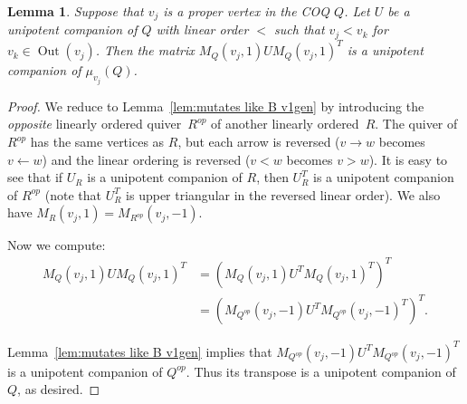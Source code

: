 \documentclass[11pt, letterpaper]{amsart}
\newcommand{\cS}[1]{{\noindent\textsf{\color{purple}$\blacksquare$~#1~$\blacksquare$}}}
\newcommand{\hide}[1]{}
\newtheorem{lemma}[theorem]{Lemma}
\theoremstyle{definition}
\numberwithin{equation}{section}
\def\Out{{\operatorname{Out}}}
\begin{document}
\begin{lemma}
\label{lem:mutates like B v2gen}
Suppose that $v_j$ is a proper vertex in the COQ $Q$.
Let $U$ be a unipotent companion of $Q$ with linear order $<$ such that $v_j < v_k$ for $v_k \in \Out(v_j)$.
Then the matrix $M_Q(v_j, 1) U M_Q(v_j, 1)^T$ is a unipotent companion of $\mu_{v_j}(Q)$.
\end{lemma}

\begin{proof}
We reduce to Lemma~\ref{lem:mutates like B v1gen} by introducing the \emph{opposite} linearly ordered quiver~$R^{op}$ of another linearly ordered~$R$.
The quiver of $R^{op}$ has the same vertices as $R$, but each arrow is reversed ($v \rightarrow w$ becomes $v \leftarrow w$) and the linear ordering is reversed ($v < w$ becomes $v > w$).
It is easy to see that if $U_R$ is a unipotent companion of $R$, then $U_R^T$ is a unipotent companion of $R^{op}$ (note that $U_R^T$ is upper triangular in the reversed linear order).
We also have $M_R(v_j, 1) = M_{R^{{op}}}(v_j, -1)$. %

Now we compute:
\begin{align*}
M_Q(v_j, 1) U M_Q(v_j, 1)^T &= ( M_Q(v_j, 1) U^T\! M_Q(v_j, 1)^T )^T\! \\
&= ( M_{Q^{op}}(v_j, -1) U^T\! M_{Q^{op}}(v_j, -1)^T )^T.
\end{align*} %

Lemma~\ref{lem:mutates like B v1gen} implies that $M_{Q^{op}}(v_j, -1) U^T M_{Q^{op}}(v_j, -1)^T$ is a unipotent companion of $Q^{op}$. 
Thus its transpose is a unipotent companion of $Q$, as desired.
\hide{
Note that, up to re-indexing, the opposite quiver switches the sign of $\varepsilon$.
Let $U$ be the unipotent companion of $Q$. %
Let $U'$ be the unipotent companion of $\mu_k(Q)$ \cS{with what linear order?}.
Thus by Lemma~\ref{lem:mutates like B v1} and Proposition~\ref{prop:op companion} (twice):
$U' = w_0 (G' w_0 U^T w_0 G'^T)^T w_0 = (w_0 G' w_0) U (w_0 G' w_0)^T$
which we recognize as the other mutating matrix.
\cS{there are some easy observations to spell this out. Do it all in this proof, no need for these one-use defs.}
}
\end{proof}
\end{document}

